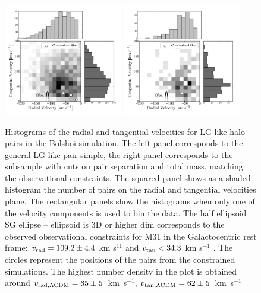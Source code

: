 \documentclass{emulateapj}
\newcommand{\kms}{\,km~s$^{-1}$}
\begin{document}
\begin{figure}
\begin{center}
\includegraphics[keepaspectratio=true,width=0.46\textwidth]{./figures/test_rt.pdf}
\includegraphics[keepaspectratio=true,width=0.46\textwidth]{./figures/test_rt_narrow.pdf}
\caption{Histograms of the radial and tangential velocities for LG-like halo pairs in the Bolshoi simulation. The left panel corresponds to the general LG-like pair simple, the right panel corresponds to the subsample with cuts on pair separation and total mass, matching the observational constraints. The squared panel shows as a shaded histogram the number of pairs on the radial and tangential velocities plane. The rectangular panels show the histograms when only one of the velocity components is used to bin the data. The half ellipsoid
SG ellipse  -- ellipsoid is 3D or higher dim
 corresponds to the observed observational constraints for M31 in the Galactocentric rest frame: $v_{\rm rad}=109.2\pm 4.4$ km s$^{11}$ and $v_{\rm tan}< 34.3$ km s$^{-1}$ \citep{vanderMarel12}. The circles represent the positions of the pairs from the constrained simulations. The highest number density in the plot is obtained around $v_{\rm rad,\Lambda CDM} = 65\pm5$ \kms, $v_{\rm tan,\Lambda CDM} = 62\pm5$ \kms}
\label{fig:rt}
\end{center}

\end{figure}
\end{document}
